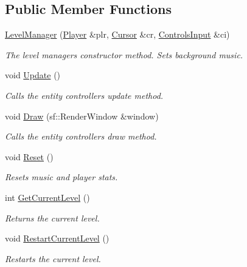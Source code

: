 \subsection*{Public Member Functions}
\begin{DoxyCompactItemize}
\item 
\hyperlink{class_level_manager_ab420f045161c3663356be1f3d8b1e50d}{Level\+Manager} (\hyperlink{class_player}{Player} \&plr, \hyperlink{class_cursor}{Cursor} \&cr, \hyperlink{struct_controls_input}{Controls\+Input} \&ci)
\begin{DoxyCompactList}\small\item\em The level manager\textquotesingle{}s constructor method. Sets background music. \end{DoxyCompactList}\item 
void \hyperlink{class_level_manager_a7800611361e7c2ae99102e69429456fc}{Update} ()
\begin{DoxyCompactList}\small\item\em Calls the entity controller\textquotesingle{}s update method. \end{DoxyCompactList}\item 
void \hyperlink{class_level_manager_a35cafa518fbbb9fdedfc6a587772bed9}{Draw} (sf\+::\+Render\+Window \&window)
\begin{DoxyCompactList}\small\item\em Calls the entity controller\textquotesingle{}s draw method. \end{DoxyCompactList}\item 
void \hyperlink{class_level_manager_a5e1dd3b7ca877857f1246c7fc95b6a3f}{Reset} ()
\begin{DoxyCompactList}\small\item\em Resets music and player stats. \end{DoxyCompactList}\item 
int \hyperlink{class_level_manager_ae76fd820eb021bb71c2f369074697965}{Get\+Current\+Level} ()
\begin{DoxyCompactList}\small\item\em Returns the current level. \end{DoxyCompactList}\item 
void \hyperlink{class_level_manager_abdd9fde4c4a21da8cb315e9c3a29120a}{Restart\+Current\+Level} ()
\begin{DoxyCompactList}\small\item\em Restarts the current level. \end{DoxyCompactList}\item 

\end{DoxyCompactItemize}

